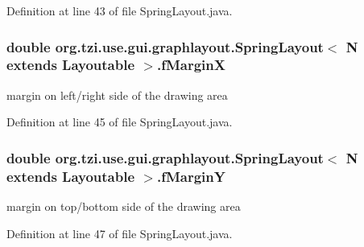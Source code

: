 Definition at line 43 of file Spring\-Layout.\-java.

\hypertarget{classorg_1_1tzi_1_1use_1_1gui_1_1graphlayout_1_1_spring_layout_3_01_n_01extends_01_layoutable_01_4_a1e71645e14e3e6724852dbbb0880cefe}{
\subsubsection[{f\-Margin\-X}]{\setlength{\rightskip}{0pt plus 5cm}double org.\-tzi.\-use.\-gui.\-graphlayout.\-Spring\-Layout$<$ N extends {\bf Layoutable} $>$.f\-Margin\-X\hspace{0.3cm}{\ttfamily [protected]}}}\label{classorg_1_1tzi_1_1use_1_1gui_1_1graphlayout_1_1_spring_layout_3_01_n_01extends_01_layoutable_01_4_a1e71645e14e3e6724852dbbb0880cefe}
margin on left/right side of the drawing area 

Definition at line 45 of file Spring\-Layout.\-java.

\hypertarget{classorg_1_1tzi_1_1use_1_1gui_1_1graphlayout_1_1_spring_layout_3_01_n_01extends_01_layoutable_01_4_a890283b5abcc1df079dd0d7181f95433}{
\subsubsection[{f\-Margin\-Y}]{\setlength{\rightskip}{0pt plus 5cm}double org.\-tzi.\-use.\-gui.\-graphlayout.\-Spring\-Layout$<$ N extends {\bf Layoutable} $>$.f\-Margin\-Y\hspace{0.3cm}{\ttfamily [protected]}}}\label{classorg_1_1tzi_1_1use_1_1gui_1_1graphlayout_1_1_spring_layout_3_01_n_01extends_01_layoutable_01_4_a890283b5abcc1df079dd0d7181f95433}
margin on top/bottom side of the drawing area 

Definition at line 47 of file Spring\-Layout.\-java.

